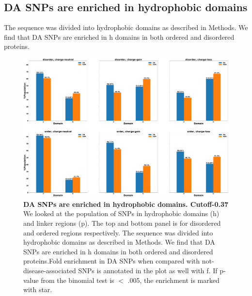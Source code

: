 \documentclass[10pt,letterpaper]{article}
\begin{document}
\clearpage
\subsection*{DA SNPs are enriched in hydrophobic domains}
\bigbreak
The sequence was divided into hydrophobic domains as described in Methods. We find that DA SNPs are enriched in h domains in both ordered and disordered proteins.  
\begin{figure}[!ht]
\includegraphics[scale=0.1,width=\textwidth,trim={0 0cm 0 0cm},clip]{./figures/charge_vs_no_charge_order_vs_disorder_SNP_Domain.pdf}
\caption{{\bf DA SNPs are enriched in hydrophobic domains. Cutoff-0.37} We looked at the population of SNPs in hydrophobic domains (h) and linker regions (p). The top and bottom panel is for disordered and ordered regions respectively. The sequence was divided into hydrophobic domains as described in Methods. We find that DA SNPs are enriched in h domains in both ordered and disordered proteins.Fold enrichment in DA SNPs when compared with not-disease-associated SNPs is annotated in the plot as well with f. If p-value from the binomial test is $<$ .005, the enrichment is marked with star.}
\label{fig5} 
\end{figure}
\end{document}
